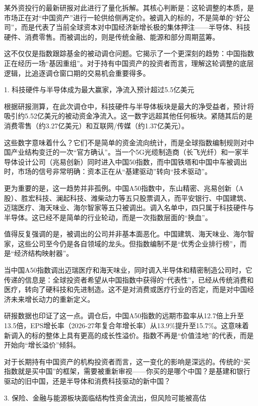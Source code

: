 \documentclass[11pt]{ctexart}
\begin{document}
某外资投行的最新研报对此进行了量化拆解。其核心判断是：这轮调整的本质，是市场正在对“中国资产”进行一轮供给侧再定价。被调入的标的，不是简单的“好公司”，而是代表了当前全球资本对中国经济新增长极的集体押注——半导体、科技硬件、消费零售。而被调出的，则是传统金融、能源和部分周期蓝筹。

这不仅仅是指数跟踪基金的被动调仓问题。它揭示了一个更深刻的趋势：中国指数正在经历一场“基因重组”。对于持有中国资产的投资者而言，理解这轮调整的底层逻辑，比追逐调仓窗口期的交易机会重要得多。

1. 科技硬件与半导体成为最大赢家，净流入预计超过5.5亿美元

根据研报测算，在此次调仓中，科技硬件与半导体板块是最大的净受益者，预计将吸引约5.52亿美元的被动资金净流入。这一数字远超其他任何板块。紧随其后的是消费零售（约3.27亿美元）和互联网/传媒（约1.37亿美元）。

这些数字意味着什么？它们不是简单的资金流向统计，而是全球指数编制规则对中国产业结构变迁的一次“官方确认”。当一个5G光缆制造商（长飞光纤）和一家半导体设计公司（兆易创新）同时进入中国50指数，而中国铁塔和中国中车被调出时，市场的信号非常明确：资本正在从“基建驱动”转向“技术驱动”。

更为重要的是，这一趋势并非孤例。中国A50指数中，东山精密、兆易创新（A股）、胜宏科技、澜起科技、潍柴动力等五只股票调入，而平安银行、中国建筑、迈瑞医疗、海天味业、海尔智家等五只被调出。调入名单中，四只属于科技硬件与半导体。这已经不是简单的行业轮动，而是一次指数层面的“换血”。

值得反复强调的是，被调出的公司并非基本面恶化。中国建筑、海天味业、海尔智家，这些公司至今仍是各自领域的龙头。但指数编制不是“优秀企业排行榜”，而是“经济结构映射器”。

当中国A50指数调出迈瑞医疗和海天味业，同时调入半导体和精密制造公司时，它传递的信息是：全球投资者希望从中国指数中获得的“代表性”，已经从传统消费和医疗，转向了硬科技和先进制造。这不是对消费或医疗行业的否定，而是对中国经济未来增长动力的重新定义。

研报数据也印证了这一点。调仓后，中国A50指数的远期市盈率从12.7倍上升至13.5倍，EPS增长率（2026-27年复合年增长率）从13.9\%提升至15.7\%。这意味着新调入的标的整体上具有更高的成长性溢价。指数不再是“价值洼地”的代表，而是开始向“增长溢价”倾斜。

对于长期持有中国资产的机构投资者而言，这一变化的影响是深远的。传统的“买指数就是买中国”的框架，需要被重新审视——你买的是哪个中国？是基建和银行驱动的旧中国，还是半导体和消费科技驱动的新中国？

3. 保险、金融与能源板块面临结构性资金流出，但风险可能被高估
\end{document}

